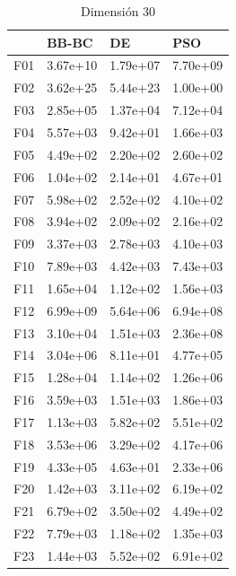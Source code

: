 \begin{table}[H]
\begin{minipage}{.5\linewidth}
        
    \end{minipage}%
    \begin{minipage}{.5\linewidth}
      \centering
        \caption{Dimensión 30}
        \begin{tabular}{llll}
            \toprule
            {} &     BB-BC &        DE &       PSO \\
            \midrule
            F01  &  3.67e+10 &  1.79e+07 &  7.70e+09 \\
            F02  &  3.62e+25 &  5.44e+23 &  1.00e+00 \\
            F03  &  2.85e+05 &  1.37e+04 &  7.12e+04 \\
            F04  &  5.57e+03 &  9.42e+01 &  1.66e+03 \\
            F05  &  4.49e+02 &  2.20e+02 &  2.60e+02 \\
            F06  &  1.04e+02 &  2.14e+01 &  4.67e+01 \\
            F07  &  5.98e+02 &  2.52e+02 &  4.10e+02 \\
            F08  &  3.94e+02 &  2.09e+02 &  2.16e+02 \\
            F09  &  3.37e+03 &  2.78e+03 &  4.10e+03 \\
            F10  &  7.89e+03 &  4.42e+03 &  7.43e+03 \\
            F11  &  1.65e+04 &  1.12e+02 &  1.56e+03 \\
            F12  &  6.99e+09 &  5.64e+06 &  6.94e+08 \\
            F13  &  3.10e+04 &  1.51e+03 &  2.36e+08 \\
            F14  &  3.04e+06 &  8.11e+01 &  4.77e+05 \\
            F15  &  1.28e+04 &  1.14e+02 &  1.26e+06 \\
            F16  &  3.59e+03 &  1.51e+03 &  1.86e+03 \\
            F17  &  1.13e+03 &  5.82e+02 &  5.51e+02 \\
            F18  &  3.53e+06 &  3.29e+02 &  4.17e+06 \\
            F19  &  4.33e+05 &  4.63e+01 &  2.33e+06 \\
            F20  &  1.42e+03 &  3.11e+02 &  6.19e+02 \\
            F21  &  6.79e+02 &  3.50e+02 &  4.49e+02 \\
            F22  &  7.79e+03 &  1.18e+02 &  1.35e+03 \\
            F23  &  1.44e+03 &  5.52e+02 &  6.91e+02 \\

\end{tabular}
\end{minipage}
\end{table}

